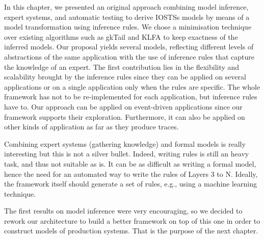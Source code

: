 In this chapter, we presented an original approach combining
model inference, expert systems, and automatic testing to derive
IOSTSs models by means of a model transformation using inference
rules.  We chose a minimisation technique over existing
algorithms such as gkTail and KLFA to keep exactness of the
inferred models.  Our proposal yields several models, reflecting
different levels of abstractions of the same application with the
use of inference rules that capture the knowledge of an expert.
The first contribution lies in the flexibility and scalability
brought by the inference rules since they can be applied on
several applications or on a single application only when the
rules are specific. The whole framework has not to be
re-implemented for each application, but inference rules have to.
Our approach can be applied on event-driven applications since
our framework supports their exploration. Furthermore, it can
also be applied on other kinds of application as far as they
produce traces.

Combining expert systems (gathering knowledge) and formal models
is really interesting but this is not a silver bullet. Indeed,
writing rules is still an heavy task, and thus not suitable as
is. It can be as difficult as writing a formal model, hence the
need for an automated way to write the rules of Layers 3 to N.
Ideally, the framework itself should generate a set of rules,
e.g., using a machine learning technique.

The first results on model inference were very encouraging, so we
decided to rework our architecture to build a better framework on
top of this one in order to construct models of production
systems. That is the purpose of the next chapter.
